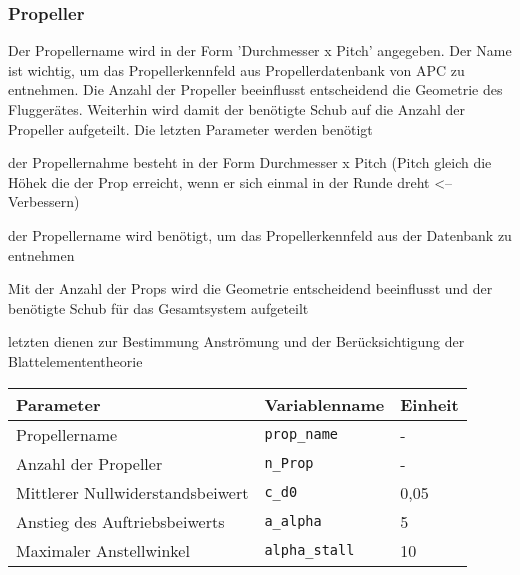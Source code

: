\subsubsection{Propeller}
Der Propellername wird in der Form 'Durchmesser x Pitch' angegeben. Der Name ist wichtig, um das Propellerkennfeld aus Propellerdatenbank von APC zu entnehmen. Die Anzahl der Propeller beeinflusst entscheidend die Geometrie des Fluggerätes. Weiterhin wird damit der benötigte Schub auf die Anzahl der Propeller aufgeteilt. Die letzten Parameter werden benötigt
\begin{description}
	\item der Propellernahme besteht in der Form Durchmesser x Pitch (Pitch gleich die Höhek die der Prop erreicht, wenn er sich einmal in der Runde dreht <-- Verbessern)
	\item der Propellername wird benötigt, um das Propellerkennfeld aus der Datenbank zu entnehmen
	\item Mit der Anzahl der Props wird die Geometrie entscheidend beeinflusst und der benötigte Schub für das Gesamtsystem aufgeteilt
	\item letzten dienen zur Bestimmung Anströmung und der Berücksichtigung der Blattelemententheorie 
	\item 
\end{description}



\begin{center}
	\begin{tabular}{l l l} \hline
		 Parameter & Variablenname & Einheit \\ \hline
		 Propellername & \texttt{prop\_name} & - \\
		 Anzahl der Propeller & \texttt{n\_Prop} & - \\
		 Mittlerer Nullwiderstandsbeiwert & \texttt{c\_d0} & 0,05 \\
		 Anstieg des Auftriebsbeiwerts & \texttt{a\_alpha} & 5 \\
		 Maximaler Anstellwinkel & \texttt{alpha\_stall} & 10\textdegree \\ \hline
	\end{tabular}	
	\label{tab:prop_parameter}
\end{center}

